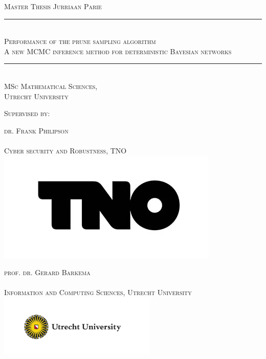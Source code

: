 \documentclass[a4paper, twoside, 11pt]{report}
\newcommand{\HRule}{\rule{\linewidth}{0.5mm}}
\theoremstyle{plain}
\theoremstyle{definition}
\theoremstyle{remark}
\begin{document}



\newcommand\indep{\protect\mathpalette{\protect\independenT}{\perp}}
\def\independenT#1#2{\mathrel{\rlap{$#1#2$}\mkern2mu{#1#2}}}


\begin{titlepage}
	\centering
	\vspace{1cm}
	
\textsc{\Large Master Thesis Jurriaan Parie }\\[1.5cm]

\HRule \\[0.4cm]
{ \huge \textsc{ Performance of the prune sampling algorithm}} \\[0.3cm]
{ \Large \textsc{ A new MCMC inference method for deterministic Bayesian networks}} \\[0.3cm]
\HRule \\[1.5cm]

\textsc{ \Large MSc Mathematical Sciences, \\ Utrecht University }

\vfill
	
\large \textsc{Supervised by:}

\vspace{2pc}
	
\begin{minipage}[t!]{.47\textwidth}
	{\large \textsc{dr. Frank Philipson} } \\ \\
	\textsc{Cyber security and Robustness, TNO} \\
	\centering
	\includegraphics[scale=0.54]{tno_logo_zwart.jpg}
\end{minipage}%
\hfill
\begin{minipage}[t!]{.47\textwidth}
	{ \large \textsc{prof. dr. Gerard Barkema} } \\ \\
	\textsc{Information and Computing Sciences, Utrecht University}
	\centering
	\includegraphics[height = 7pc]{UU_logo_EN_RGB.jpg}
\end{minipage}


\end{titlepage}
\end{document}
